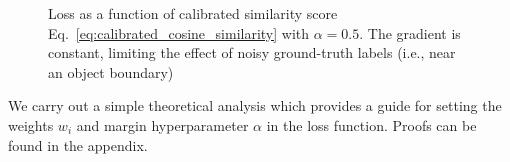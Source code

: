 \documentclass[10pt,twocolumn,letterpaper]{article}
\begin{document}
\begin{figure}[t]
\vspace{-1mm}
\hfill%
\begin{minipage}[t]{0.23\textwidth} %
\caption{\small
Loss as a function of calibrated similarity score Eq.~\ref{eq:calibrated_cosine_similarity}
with $\alpha=0.5$. The
gradient is constant, limiting the effect of noisy ground-truth labels
 (i.e., near an object boundary)}
\label{fig:lossFunc}
\end{minipage}
\vspace{-4mm}
\end{figure}

We carry out a simple theoretical analysis which provides a guide for setting
the weights $w_i$ and margin hyperparameter $\alpha$ in the loss function. Proofs
can be found in the appendix.
\end{document}
